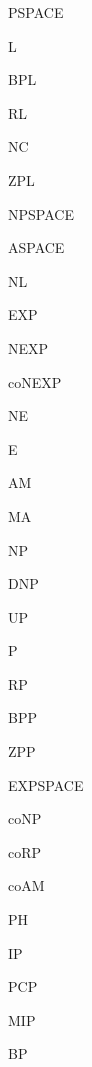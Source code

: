 \usepackage{fullpage}
\usepackage{color}
\usepackage{graphicx}
\usepackage{epsfig}
\usepackage{amsthm}
\usepackage{latexsym}
\usepackage{amssymb}
\usepackage{amsmath}
\usepackage{algorithmicx,algorithm}
\usepackage[noend]{algpseudocode}
\usepackage{verbatim}
\usepackage{mathrsfs}
\usepackage{unicode-math}
\usepackage{xepersian}


\newcommand{\newfontobj}[2]{
  \newcommand{#1}[1]{
    \expandafter\def\csname##1\endcsname{{#2 ##1}}}}

\newfontobj{\class}{\rm} %



\class{PSPACE}	
\class{L}
\class{BPL}
\class{RL}
\class{NC}
\class{ZPL}
\class{NPSPACE}	
\class{ASPACE}	
\class{NL}
\class{EXP}
\class{NEXP}
\class{coNEXP}
\class{NE}
\class{E}
\class{AM}		
\class{MA}
\class{NP}
\class{DNP}
\class{UP}
\class{P}
\class{RP}
\class{BPP}
\class{ZPP}
\class{EXPSPACE}
\class{coNP}
\class{coRP}
\class{coAM}
\class{PH}
\class{IP}
\class{PCP}
\class{MIP}

\class{BP}

\newcommand{\SHARPP}{{\#\rm{P}}}
\newcommand{\PARITYP}{{\oplus\rm{P}}}

\DeclareMathOperator{\poly}{poly}
\DeclareMathOperator{\Majority}{Majority}
\DeclareMathOperator{\quasipoly}{quasi-poly}
\DeclareMathOperator{\polylog}{poly-log}
\DeclareMathOperator{\superpoly}{super-poly}
\DeclareMathOperator{\DTISP}{DTISP}
\DeclareMathOperator{\DSPACE}{DSPACE}
\DeclareMathOperator{\DTIME}{DTIME}
\DeclareMathOperator{\NSPACE}{NSPACE}
\DeclareMathOperator{\NTIME}{NTIME}
\DeclareMathOperator{\BPTIME}{BPTIME}
\DeclareMathOperator{\RTIME}{RTIME}
\DeclareMathOperator{\ZPTIME}{ZPTIME}
\DeclareMathOperator{\BPSPACE}{BPSPACE}
\DeclareMathOperator{\RSPACE}{RSPACE}
\DeclareMathOperator{\ZPSPACE}{ZPSPACE}


\newcommand{\CC}{\mathcal{C}}


\newenvironment{الگوریتم}[1]
{\bigskip\bigskip\begin{algorithm}\caption{#1} \label{الگوریتم: #1}\vspace{0.5em}\begin{algorithmic}[1]}
		{\end{algorithmic}\vspace{0.5em}\end{algorithm}\bigskip}


